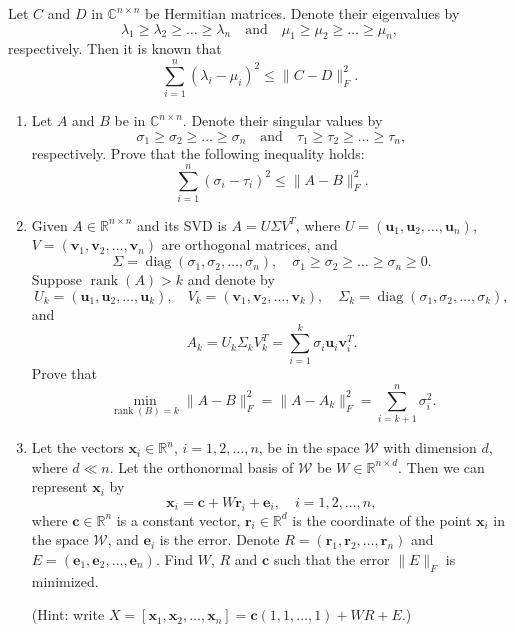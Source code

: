 \begin{exercise}
\label{applied:2012:4}
Let $C$ and $D$ in $\mathbb{C}^{n\times n}$ be Hermitian matrices. Denote their eigenvalues by
\[
\lambda_{1}\geq\lambda_{2}\geq\dots\geq\lambda_{n}\quad\text{and}\quad\mu_{1}\geq\mu_{2}\geq\dots\geq\mu_{n},
\]
respectively. Then it is known that
\[
\sum_{i=1}^{n}(\lambda_{i}-\mu_{i})^{2}\leq\|C-D\|_{F}^{2}.
\]

\begin{enumerate}
    \item[(1)] Let $A$ and $B$ be in $\mathbb{C}^{n\times n}$. Denote their singular values by
    \[
    \sigma_{1}\geq\sigma_{2}\geq\dots\geq\sigma_{n}\quad\text{and}\quad\tau_{1}\geq\tau_{2}\geq\dots\geq\tau_{n},
    \]
    respectively. Prove that the following inequality holds:
    \[
    \sum_{i=1}^{n}(\sigma_{i}-\tau_{i})^{2}\leq\|A-B\|_{F}^{2}.
    \]
    \item[(2)] Given $A\in\mathbb{R}^{n\times n}$ and its SVD is $A=U\Sigma V^{T}$, where $U=(\mathbf{u}_{1},\mathbf{u}_{2},\ldots,\mathbf{u}_{n})$, $V=(\mathbf{v}_{1},\mathbf{v}_{2},\ldots,\mathbf{v}_{n})$ are orthogonal matrices, and
    \[
    \Sigma=\operatorname{diag}(\sigma_{1},\sigma_{2},\dots,\sigma_{n}),\quad\sigma_{1}\geq\sigma_{2}\geq\dots\geq\sigma_{n}\geq0.
    \]
    Suppose $\operatorname{rank}(A)>k$ and denote by
    \[
    U_{k}=(\mathbf{u}_{1},\mathbf{u}_{2},\dots,\mathbf{u}_{k}),\quad V_{k}=(\mathbf{v}_{1},\mathbf{v}_{2},\dots,\mathbf{v}_{k}),\quad\Sigma_{k}=\operatorname{diag}(\sigma_{1},\sigma_{2},\dots,\sigma_{k}),
    \]
    and
    \[
    A_{k}=U_{k}\Sigma_{k}V_{k}^{T}=\sum_{i=1}^{k}\sigma_{i}\mathbf{u}_{i}\mathbf{v}_{i}^{T}.
    \]
    Prove that
    \[
    \min_{\operatorname{rank}(B)=k}\|A-B\|_{F}^{2}=\|A-A_{k}\|_{F}^{2}=\sum_{i=k+1}^{n}\sigma_{i}^{2}.
    \]
    \item[(3)] Let the vectors $\mathbf{x}_{i}\in\mathbb{R}^{n}$, $i=1,2,\dots,n$, be in the space $\mathcal{W}$ with dimension $d$, where $d\ll n$. Let the orthonormal basis of $\mathcal{W}$ be $W\in\mathbb{R}^{n\times d}$. Then we can represent $\mathbf{x}_{i}$ by
    \[
    \mathbf{x}_{i}=\mathbf{c}+W\mathbf{r}_{i}+\mathbf{e}_{i},\quad i=1,2,\ldots,n,
    \]
    where $\mathbf{c}\in\mathbb{R}^{n}$ is a constant vector, $\mathbf{r}_{i}\in\mathbb{R}^{d}$ is the coordinate of the point $\mathbf{x}_{i}$ in the space $\mathcal{W}$, and $\mathbf{e}_{i}$ is the error. Denote $R=(\mathbf{r}_{1},\mathbf{r}_{2},\ldots,\mathbf{r}_{n})$ and $E=(\mathbf{e}_{1},\mathbf{e}_{2},\ldots,\mathbf{e}_{n})$. Find $W$, $R$ and $\mathbf{c}$ such that the error $\|E\|_{F}$ is minimized.

    (Hint: write $X=[\mathbf{x}_{1},\mathbf{x}_{2},\ldots,\mathbf{x}_{n}]=\mathbf{c}(1,1,\ldots,1)+WR+E$.)
\end{enumerate}
\end{exercise}

